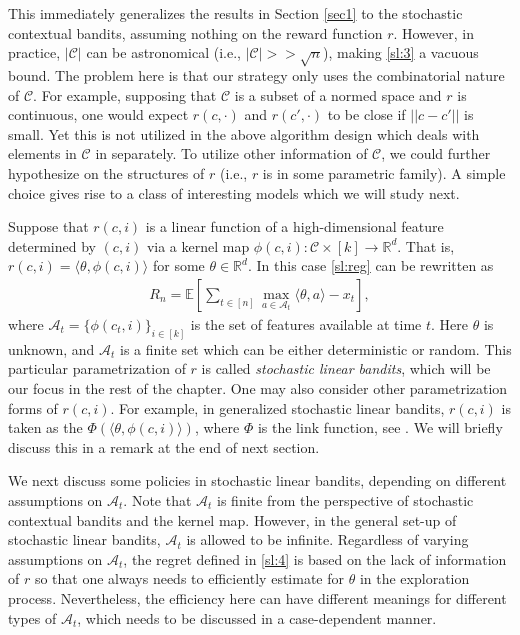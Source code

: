 \documentclass[letterpaper,11pt,openright,openany]{book}
\numberwithin{equation}{section}
\theoremstyle{plain}
\theoremstyle{definition}
\def\R{{\mathbb R}}
\def\E{{\mathbb E}}
\def\R{{\mathbb R}}
\def\t{{\theta}}
\begin{document}
This immediately generalizes the results in Section \ref{sec1} to the stochastic contextual bandits, assuming nothing on the reward function $r$. However, in practice, $|\mathcal C|$ can be astronomical (i.e., $|\mathcal C|>>\sqrt{n}$), making \eqref{sl:3} a vacuous bound.  The problem here is that our strategy only uses the combinatorial nature of $\mathcal C$. For example, supposing that $\mathcal C$ is a subset of a normed space and $r$ is continuous, one would expect $r(c, \cdot)$ and $r(c', \cdot)$ to be close if $||c-c'||$ is small. Yet this is not utilized in the above algorithm design which deals with elements in $\mathcal C$ in separately. To utilize other information of $\mathcal C$, we could further hypothesize on the structures of $r$ (i.e., $r$ is in some parametric family). A simple choice gives rise to a class of interesting models which we will study next. 

Suppose that $r(c,i)$ is a linear function of a high-dimensional feature determined by $(c, i)$ via a kernel map $\phi(c,i): \mathcal C\times [k]\to\R^d$. That is, $r(c, i) = \langle\t, \phi(c,i) \rangle$ for some $\t\in\R^d$. In this case \eqref{sl:reg} can be rewritten as 
\begin{align}
R_n = \E\left[\sum_{t\in [n]}\max_{a\in\mathcal A_t}\langle\theta, a\rangle-x_{t}\right],\label{sl:4}
\end{align}  
where $\mathcal A_t = \{\phi(c_t, i)\}_{i\in [k]}$ is the set of features available at time $t$. Here $\theta$ is unknown, and $\mathcal A_t$ is a finite set which can be either deterministic or random. This particular parametrization of $r$ is called \emph{stochastic linear bandits}, which will be our focus in the rest of the chapter.  One may also consider other parametrization forms of $r(c,i)$. For example, in generalized stochastic linear bandits, $r(c,i)$ is taken as the $\Phi( \langle\t, \phi(c,i) \rangle)$, where $\Phi$ is the link function, see \cite{filippi2010parametric, li2017provably}. We will briefly discuss this in a remark at the end of next section. 

We next discuss some policies in stochastic linear bandits, depending on different assumptions on $\mathcal A_t$. Note that $\mathcal A_t$ is finite from the perspective of stochastic contextual bandits and the kernel map. However, in the general set-up of stochastic linear bandits, $\mathcal A_t$ is allowed to be infinite. Regardless of varying assumptions on $\mathcal A_t$, the regret defined in \eqref{sl:4} is based on the lack of information of $r$ so that one always needs to efficiently estimate for $\theta$ in the exploration process. Nevertheless, the efficiency here can have different meanings for different types of $\mathcal A_t$, which needs to be discussed in a case-dependent manner. 
\end{document}
